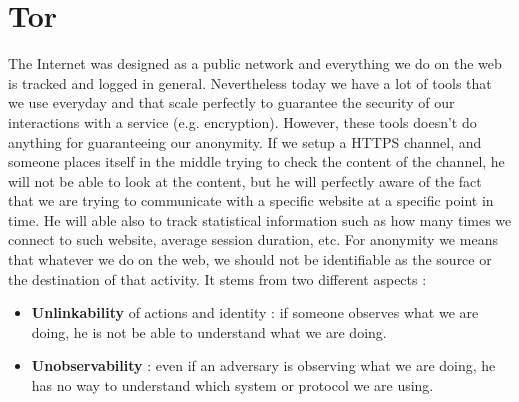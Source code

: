 \section{Tor}
The Internet was designed as a public network and everything we do on the web is tracked and logged in general. Nevertheless today we have a lot of tools that we use everyday and that scale perfectly to guarantee the security of our interactions with a service (e.g. encryption). However, these tools doesn't do anything for guaranteeing our anonymity. If we setup a HTTPS channel, and someone places itself in the middle trying to check the content of the channel, he will not be able to look at the content, but he will perfectly aware of the fact that we are trying to communicate with a specific website at a specific point in time. He will able also to track statistical information such as how many times we connect to such website, average session duration, etc. For anonymity we means that whatever we do on the web, we should not be identifiable as the source or the destination of that activity. It stems from two different aspects : 
\begin{itemize}
\item \textbf{Unlinkability} of actions and identity : if someone observes what we are doing, he is not be able to understand what we are doing.
\item \textbf{Unobservability} : even if an adversary is observing what we are doing, he has no way to understand which system or protocol we are using.
\end{itemize}
